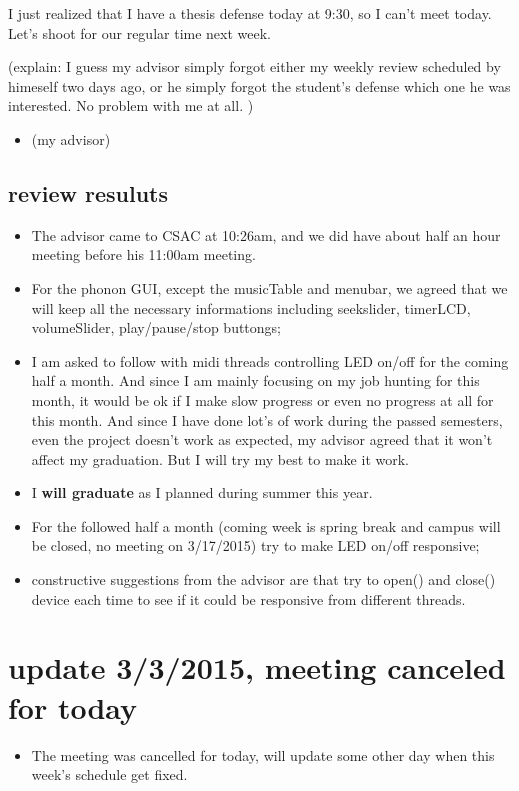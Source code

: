 \documentclass[9pt,b5paper]{article}
\begin{document}
I just realized that I have a thesis defense today at 9:30, so I can't meet today. Let's shoot for our regular time next week.

(explain: I guess my advisor simply forgot either my weekly review scheduled by himeself two days ago, or he simply forgot the student's defense which one he was interested. No problem with me at all. )

\begin{itemize}
\item (my advisor)
\end{itemize}
\subsection{review resuluts}
\label{sec-1-4}
\begin{itemize}
\item The advisor came to CSAC at 10:26am, and we did have about half an hour meeting before his 11:00am meeting.
\item For the phonon GUI, except the musicTable and menubar, we agreed that we will keep all the necessary informations including seekslider, timerLCD, volumeSlider, play/pause/stop buttongs;
\item I am asked to follow with midi threads controlling LED on/off for the coming half a month. And since I am mainly focusing on my job hunting for this month, it would be ok if I make slow progress or even no progress at all for this month. And since I have done lot's of work during the passed semesters, even the project doesn't work as expected, my advisor agreed that it won't affect my graduation. But I will try my best to make it work.
\item I \textbf{will graduate} as I planned during summer this year.
\item For the followed half a month (coming week is spring break and campus will be closed, no meeting on 3/17/2015) try to make LED on/off responsive;
\item constructive suggestions from the advisor are that try to open() and close() device each time to see if it could be responsive from different threads.
\end{itemize}

\section{update 3/3/2015, meeting canceled for today}
\label{sec-2}
\begin{itemize}
\item The meeting was cancelled for today, will update some other day when this week's schedule get fixed.
\end{itemize}
\end{document}
